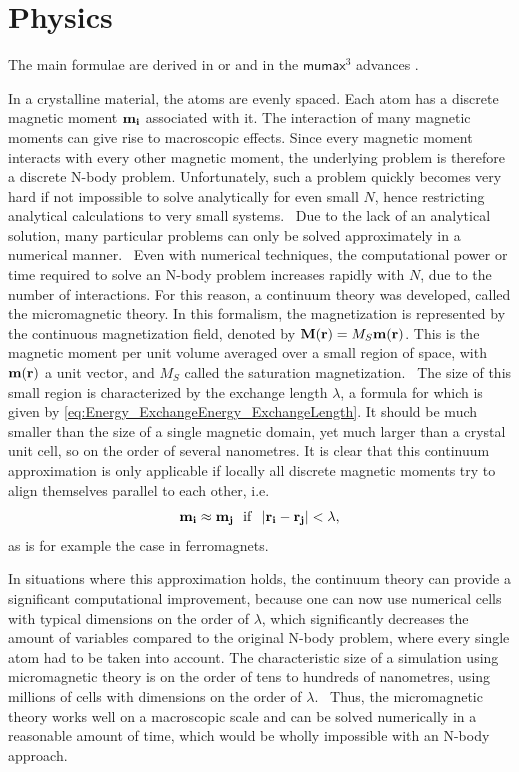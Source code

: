 \documentclass[10pt,a4paper]{article}
\newcommand{\mumax}{$\mathsf{mumax}^3$}
\begin{document}
\section{Physics}
The main formulae are derived in \cite{abert2013discrete} or \cite{NML_Carlton} and in the \mumax{} advances \cite{MuMax3_advances}. \par
In a crystalline material, the atoms are evenly spaced. Each atom has a discrete magnetic moment $\vb{m_i}$ associated with it. The interaction of many magnetic moments can give rise to macroscopic effects. Since every magnetic moment interacts with every other magnetic moment, the underlying problem is therefore a discrete N-body problem. Unfortunately, such a problem quickly becomes very hard if not impossible to solve analytically for even small $N$, hence restricting analytical calculations to very small systems.~\cite{abert2013discrete} Due to the lack of an analytical solution, many particular problems can only be solved approximately in a numerical manner.~\cite{abert2013discrete} Even with numerical techniques, the computational power or time required to solve an N-body problem increases rapidly with $N$, due to the number of interactions. For this reason, a continuum theory was developed, called the micromagnetic theory. In this formalism, the magnetization is represented by the continuous magnetization field, denoted by $\vb{M}(\vb{r}) = M_S \vb{m}(\vb{r})$. This is the magnetic moment per unit volume averaged over a small region of space, with $\vb{m}(\vb{r})$ a unit vector, and $M_S$ called the saturation magnetization.~\cite{Gilbert1956}
The size of this small region is characterized by the exchange length $\lambda$, a formula for which is given by \cref{eq:Energy_ExchangeEnergy_ExchangeLength}. It should be much smaller than the size of a single magnetic domain, yet much larger than a crystal unit cell, so on the order of several nanometres. It is clear that this continuum approximation is only applicable if locally all discrete magnetic moments try to align themselves parallel to each other, i.e.
\begin{equation}
    \vb{m_i} \approx \vb{m_j}~~\mathrm{if}~~\abs{\vb{r_i} - \vb{r_j}} < \lambda \mathrm{,}
\end{equation}
as is for example the case in ferromagnets.~\cite{abert2013discrete} \par
In situations where this approximation holds, the continuum theory can provide a significant computational improvement, because one can now use numerical cells with typical dimensions on the order of $\lambda$, which significantly decreases the amount of variables compared to the original N-body problem, where every single atom had to be taken into account. The characteristic size of a simulation using micromagnetic theory is on the order of tens to hundreds of nanometres, using millions of cells with dimensions on the order of $\lambda$.~\cite{abert2013discrete} Thus, the micromagnetic theory works well on a macroscopic scale and can be solved numerically in a reasonable amount of time, which would be wholly impossible with an N-body approach.
\end{document}
